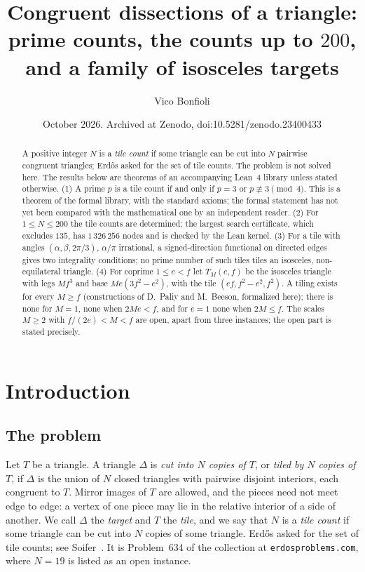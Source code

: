 \documentclass[11pt,reqno]{amsart}
\title[Congruent dissections of a triangle]{Congruent dissections of a triangle: prime counts, the counts up
to $200$, and a family of isosceles targets}
\author{Vico Bonfioli}
\date{October 2026. Archived at Zenodo, doi:10.5281/zenodo.23400433}
\theoremstyle{plain}
\theoremstyle{definition}
\begin{document}
\begin{abstract}
A positive integer $N$ is a \emph{tile count} if some triangle can be cut into $N$ pairwise congruent
triangles; Erd\H{o}s asked for the set of tile counts. The problem is not solved here. The results below
are theorems of an accompanying Lean~4 library unless stated otherwise.
\textup{(1)} A prime $p$ is a tile count if and only if $p=3$ or $p\not\equiv3\pmod4$. This is a theorem of
the formal library, with the standard axioms; the formal statement has not yet been compared with the
mathematical one by an independent reader.
\textup{(2)} For $1\le N\le200$ the tile counts are determined; the largest search certificate, which excludes $135$, has
$1\,326\,256$ nodes and is checked by the Lean kernel.
\textup{(3)} For a tile with angles $(\alpha,\beta,2\pi/3)$, $\alpha/\pi$ irrational, a signed-direction
functional on directed edges gives two integrality conditions; no prime number of such tiles tiles an
isosceles, non-equilateral triangle.
\textup{(4)} For coprime $1\le e<f$ let $T_M(e,f)$ be the isosceles triangle with legs $Mf^3$ and base
$Me(3f^2-e^2)$, with the tile $(ef,f^2-e^2,f^2)$. A tiling exists for every $M\ge f$ (constructions of
D.~Paliy and M.~Beeson, formalized here); there is none for $M=1$, none when $2Me<f$, and for $e=1$ none when
$2M\le f$. The scales $M\ge2$ with $f/(2e)<M<f$ are open, apart from three instances; the open part is stated
precisely.
\end{abstract}

\maketitle

\section{Introduction}\label{sec:intro}

\subsection{The problem}
Let $T$ be a triangle. A triangle $\Delta$ is \emph{cut into $N$ copies of $T$}, or \emph{tiled by $N$
copies of $T$}, if $\Delta$ is the union of $N$ closed triangles with pairwise disjoint interiors, each
congruent to $T$. Mirror images of $T$ are allowed, and the pieces need not meet edge to edge: a vertex of
one piece may lie in the relative interior of a side of another. We call $\Delta$ the \emph{target} and $T$
the \emph{tile}, and we say that $N$ is a \emph{tile count} if some triangle can be cut into $N$ copies of
some triangle. Erd\H{o}s asked for the set of tile counts; see Soifer~\cite{Soifer}. It is Problem~634 of
the collection at \texttt{erdosproblems.com}, where $N=19$ is listed as an open instance.
\end{document}
